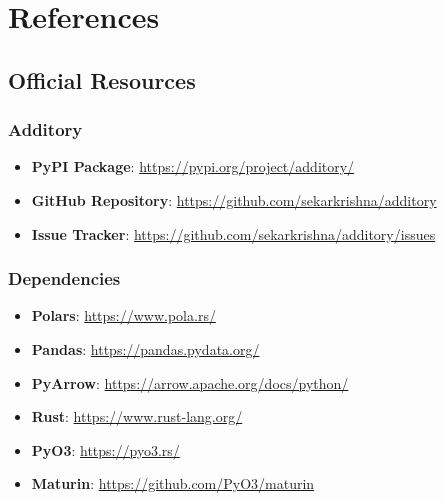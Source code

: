 \documentclass[
  letterpaper,
]{scrbook}
\providecommand{\tightlist}{%
  \setlength{\itemsep}{0pt}\setlength{\parskip}{0pt}}
\begin{document}

\chapter*{References}\label{references}


\section*{Official Resources}\label{official-resources}


\subsection*{Additory}\label{additory}

\begin{itemize}
\tightlist
\item
  \textbf{PyPI Package}: \url{https://pypi.org/project/additory/}
\item
  \textbf{GitHub Repository}:
  \url{https://github.com/sekarkrishna/additory}
\item
  \textbf{Issue Tracker}:
  \url{https://github.com/sekarkrishna/additory/issues}
\end{itemize}

\subsection*{Dependencies}\label{dependencies}

\begin{itemize}
\tightlist
\item
  \textbf{Polars}: \url{https://www.pola.rs/}
\item
  \textbf{Pandas}: \url{https://pandas.pydata.org/}
\item
  \textbf{PyArrow}: \url{https://arrow.apache.org/docs/python/}
\item
  \textbf{Rust}: \url{https://www.rust-lang.org/}
\item
  \textbf{PyO3}: \url{https://pyo3.rs/}
\item
  \textbf{Maturin}: \url{https://github.com/PyO3/maturin}
\end{itemize}
\end{document}

